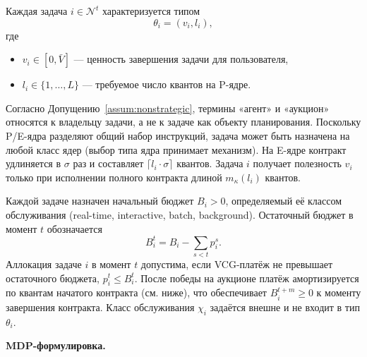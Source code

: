\documentclass[14pt, oneside]{extbook}
\begin{document}
        Каждая задача $i \in \mathcal{N}^t$ характеризуется
        типом
        \begin{equation*}
                \theta_i = (v_i, l_i),
        \end{equation*}
        где
        \begin{itemize}
                \item $v_i \in [0, \bar{V}]$ --- ценность завершения
                        задачи для пользователя,
                \item $l_i \in \{1, \ldots, L\}$ --- требуемое число
                        квантов на P-ядре.
        \end{itemize}
        Согласно Допущению~\ref{assum:nonstrategic},
        термины «агент» и «аукцион» относятся к владельцу
        задачи, а не к задаче как объекту планирования.
        Поскольку P/E-ядра разделяют общий набор инструкций,
        задача может быть назначена на любой класс ядер
        (выбор типа ядра принимает механизм). На E-ядре
        контракт удлиняется в $\sigma$ раз и составляет
        $\lceil l_i \cdot \sigma \rceil$ квантов. Задача $i$
        получает полезность $v_i$ только при исполнении
        полного контракта длиной $m_\kappa(l_i)$ квантов.

        Каждой задаче назначен начальный бюджет $B_i > 0$,
        определяемый её классом обслуживания (real-time,
        interactive, batch, background). Остаточный бюджет в
        момент $t$ обозначается
        \begin{equation*}
                B_i^t = B_i - \sum_{s < t} p_i^s.
        \end{equation*}
        Аллокация задаче $i$ в момент $t$ допустима, если
        VCG-платёж не превышает остаточного бюджета, $p_i^t \leq
        B_i^t$. После победы на аукционе платёж амортизируется по
        квантам начатого контракта (см. ниже), что обеспечивает
        $B_i^{t+m} \geq 0$ к моменту завершения контракта.
        Класс обслуживания $\chi_i$ задаётся внешне и не
        входит в тип $\theta_i$.


\textbf{MDP-формулировка.}
\end{document}
